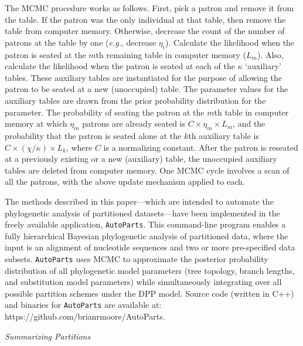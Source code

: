 \documentclass[11pt]{article}
\begin{document}
The MCMC procedure works as follows. 
First, pick a patron and remove it from the table. If the patron was the only individual at that table, then remove the table from computer memory.
Otherwise, decrease the count of the number of patrons at the table by one ({\it e.g.}, decrease $\eta_i$).
Calculate the likelihood when the patron is seated at 
the $m$th remaining table in computer memory ($L_m$).
Also, calculate the likelihood when the patron is seated at each of the $\kappa$ `auxiliary' tables.
These auxiliary tables are instantiated for the purpose of allowing the patron to be seated at a new (unoccupied) table.
The parameter values for the auxiliary tables are drawn from the prior probability distribution for the parameter.
The probability of seating the patron at the $m$th table in computer memory at which $\eta_m$ patrons are already seated is
$C \times \eta_m \times L_m$, and the probability that the patron is seated alone at the $k$th auxiliary table is $C \times (\chi/ \kappa) \times L_k$, where
$C$ is a normalizing constant.
After the patron is reseated at a previously existing or a new (auxiliary) table, the unoccupied auxiliary tables are deleted from computer memory.
One MCMC cycle involves a scan of all the patrons, with the above update mechanism applied to each.

The methods described in this paper---which are intended to automate the phylogenetic analysis of partitioned datasets---have been implemented in the freely available
application, \verb!AutoParts!.
This command-line program enables a fully hierarchical Bayesian phylogenetic analysis of partitioned data, where the input is an alignment of nucleotide sequences and two or more pre-specified data subsets.
\verb!AutoParts! uses MCMC to approximate the posterior probability distribution of all phylogenetic model parameters (tree topology, branch lengths, and substitution model parameters) while simultaneously integrating over all possible partition schemes under the DPP model.  
Source code (written in C++) and binaries for \verb!AutoParts! are available at: https://github.com/brianrmoore/AutoParts.


\bigskip
\begin{center}
{\it Summarizing Partitions}
\end{center}
\end{document}
